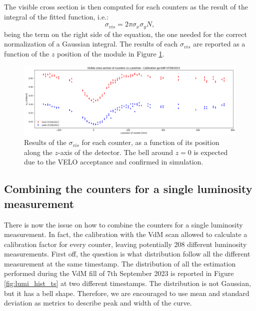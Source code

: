 The visible cross section is then computed for each counters as the result of the integral of the fitted function, i.e.:
\begin{equation}
    \sigma_{vis}=2\pi\sigma_x\sigma_y N,
\end{equation}
being the term on the right side of the equation, the one needed for the correct normalization of a Gaussian integral. The results of each $\sigma_{vis}$ are reported as a function of the $z$ position of the module in Figure \ref{fig:coefficient_pos}.

\begin{figure}
    \centering
    \includegraphics[width=\textwidth]{figures/coefficient_pos.png}
    \caption{Results of the $\sigma_{vis}$ for each counter, as a function of its position along the $z$-axis of the detector. The bell around $z=0$ is expected due to the VELO acceptance and confirmed in simulation.}
    \label{fig:coefficient_pos}
\end{figure}



\subsection{Combining the counters for a single luminosity measurement}
There is now the issue on how to combine the counters for a single luminosity measurement. In fact, the calibration with the VdM scan allowed to calculate a calibration factor for every counter, leaving potentially 208 different luminosity measurements. 
First off, the question is what distribution follow all the different measurement at the same timestamp. 
The distribution of all the estimation performed during the VdM fill of 7th September 2023 is reported in Figure \ref{fig:lumi_hist_ts} at two different timestamps. The distribution is not Gaussian, but it has a bell shape. Therefore, we are encouraged to use mean and standard deviation as metrics to describe peak and width of the curve. 


